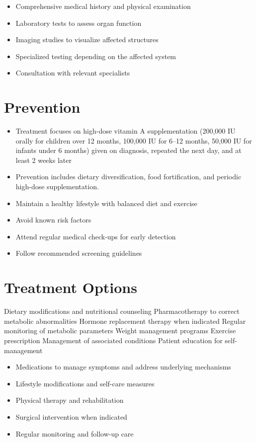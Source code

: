 \begin{itemize}[noitemsep]
  \item Comprehensive medical history and physical examination
  \item Laboratory tests to assess organ function
  \item Imaging studies to visualize affected structures
  \item Specialized testing depending on the affected system
  \item Consultation with relevant specialists
\end{itemize}
\section{Prevention}
\begin{itemize}[noitemsep]
  \item Treatment focuses on high-dose vitamin A supplementation (200,000 IU orally for children over 12 months, 100,000 IU for 6--12 months, 50,000 IU for infants under 6 months) given on diagnosis, repeated the next day, and at least 2 weeks later
  \item Prevention includes dietary diversification, food fortification, and periodic high-dose supplementation.
  \item Maintain a healthy lifestyle with balanced diet and exercise
  \item Avoid known risk factors
  \item Attend regular medical check-ups for early detection
  \item Follow recommended screening guidelines
\end{itemize}
\section{Treatment Options}
Dietary modifications and nutritional counseling Pharmacotherapy to correct metabolic abnormalities Hormone replacement therapy when indicated Regular monitoring of metabolic parameters Weight management programs Exercise prescription Management of associated conditions Patient education for self-management

\begin{itemize}[noitemsep]
  \item Medications to manage symptoms and address underlying mechanisms
  \item Lifestyle modifications and self-care measures
  \item Physical therapy and rehabilitation
  \item Surgical intervention when indicated
  \item Regular monitoring and follow-up care
\end{itemize}
